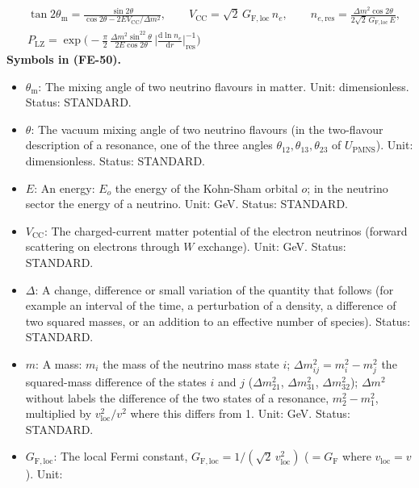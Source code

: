 \documentclass[
  10pt,
]{article}
\providecommand{\tightlist}{%
  \setlength{\itemsep}{0pt}\setlength{\parskip}{0pt}}
\begin{document}
\[
\begin{aligned}
&\tan2\theta_{\mathrm{m}} = \frac{\sin2\theta}{\cos2\theta - 2EV_{\mathrm{CC}}/\Delta m^2},\qquad
 V_{\mathrm{CC}} = \sqrt2\,G_{\mathrm{F,loc}}\,n_e,\qquad
 n_{e,\mathrm{res}} = \frac{\Delta m^2\cos2\theta}{2\sqrt2\,G_{\mathrm{F,loc}}\,E},\\
&P_{\mathrm{LZ}} = \exp\Big(-\frac{\pi}{2}\,\frac{\Delta m^2\sin^22\theta}{2E\cos2\theta}\,\Big\lvert\frac{\mathrm{d}\ln n_e}{\mathrm{d}r}\Big\rvert^{-1}_{\mathrm{res}}\Big)
\end{aligned} \tag{FE-50}
\] \textbf{Symbols in (FE-50).}

\begin{itemize}
\tightlist
\item
  \(\theta_{\mathrm{m}}\): The mixing angle of two neutrino flavours in
  matter. Unit: dimensionless. Status: STANDARD.
\item
  \(\theta\): The vacuum mixing angle of two neutrino flavours (in the
  two-flavour description of a resonance, one of the three angles
  \(\theta_{12}, \theta_{13}, \theta_{23}\) of \(U_{\mathrm{PMNS}}\)).
  Unit: dimensionless. Status: STANDARD.
\item
  \(E\): An energy: \(E_o\) the energy of the Kohn-Sham orbital \(o\);
  in the neutrino sector the energy of a neutrino. Unit: GeV. Status:
  STANDARD.
\item
  \(V_{\mathrm{CC}}\): The charged-current matter potential of the
  electron neutrinos (forward scattering on electrons through \(W\)
  exchange). Unit: GeV. Status: STANDARD.
\item
  \(\Delta\): A change, difference or small variation of the quantity
  that follows (for example an interval of the time, a perturbation of a
  density, a difference of two squared masses, or an addition to an
  effective number of species). Status: STANDARD.
\item
  \(m\): A mass: \(m_i\) the mass of the neutrino mass state \(i\);
  \(\Delta m_{ij}^2 = m_i^2 - m_j^2\) the squared-mass difference of the
  states \(i\) and \(j\) (\(\Delta m_{21}^2\), \(\Delta m_{31}^2\),
  \(\Delta m_{32}^2\)); \(\Delta m^2\) without labels the difference of
  the two states of a resonance, \(m_2^2 - m_1^2\), multiplied by
  \(v_{\mathrm{loc}}^2/v^2\) where this differs from 1. Unit: GeV.
  Status: STANDARD.
\item
  \(G_{\mathrm{F,loc}}\): The local Fermi constant,
  \(G_{\mathrm{F,loc}} = 1/(\sqrt2\,v_{\mathrm{loc}}^2)\)
  (\(= G_{\mathrm{F}}\) where \(v_{\mathrm{loc}} = v\)). Unit:

\end{itemize}
\end{document}
